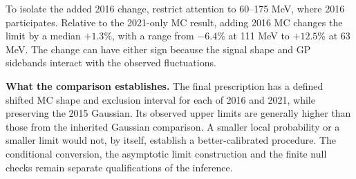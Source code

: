 To isolate the added 2016 change, restrict attention to 60--175 MeV, where 2016 participates. Relative to the 2021-only MC result, adding 2016 MC changes the limit by a median $+1.3\%$, with a range from $-6.4\%$ at 111 MeV to $+12.5\%$ at 63 MeV. The change can have either sign because the signal shape and GP sidebands interact with the observed fluctuations.

\textbf{What the comparison establishes.} The final prescription has a defined shifted MC shape and exclusion interval for each of 2016 and 2021, while preserving the 2015 Gaussian. Its observed upper limits are generally higher than those from the inherited Gaussian comparison. A smaller local probability or a smaller limit would not, by itself, establish a better-calibrated procedure. The conditional conversion, the asymptotic limit construction and the finite null checks remain separate qualifications of the inference.
